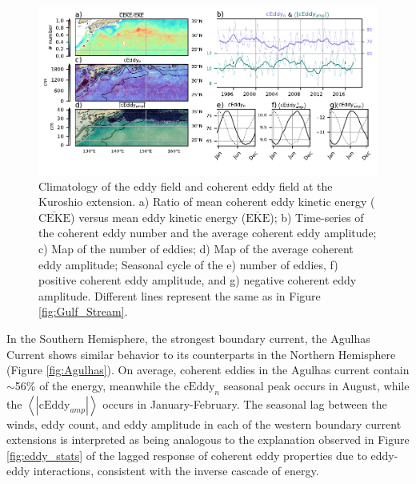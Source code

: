 \documentclass[draft,linenumbers]{agujournal2019}
\newcommand{\MEKE}{\overline{\textrm{EKE}}}
\newcommand{\MCEKE}{\overline{\textrm{CEKE}}}
\newcommand{\cEddy}{\textrm{cEddy}}
\begin{document}
	\begin{figure}
	    \centering
	    \includegraphics[width=1\textwidth]{figures/regional_ratios_and_stats_V3_4.pdf}
	    \caption{Climatology of the eddy field and coherent eddy field at the Kuroshio extension. a) Ratio of mean coherent eddy kinetic energy ($\MCEKE$) versus mean eddy kinetic energy ($\MEKE$); b) Time-series of the coherent eddy number and the average coherent eddy amplitude; c) Map of the number of eddies; d) Map of the average coherent eddy amplitude; Seasonal cycle of the e) number of eddies, f) positive coherent eddy amplitude, and g) negative coherent eddy amplitude. Different lines represent the same as in Figure \ref{fig:Gulf_Stream}.}
	    \label{fig:Kuroshio}
	\end{figure}

	In the Southern Hemisphere, the strongest boundary current, the Agulhas Current shows similar behavior to its counterparts in the Northern Hemisphere (Figure \ref{fig:Agulhas}). On average, coherent eddies in the Agulhas current contain $\sim$56\% of the energy, meanwhile the $\cEddy_{n}$ seasonal peak occurs in August, while the $\left<|\cEddy_{amp}|\right>$ occurs in January-February. 
	The seasonal lag between the winds, eddy count, and eddy amplitude in each of the western boundary current extensions is interpreted as being analogous to the explanation observed in Figure \ref{fig:eddy_stats} of the lagged response of coherent eddy properties due to eddy-eddy interactions, consistent with the inverse cascade of energy.
\end{document}
